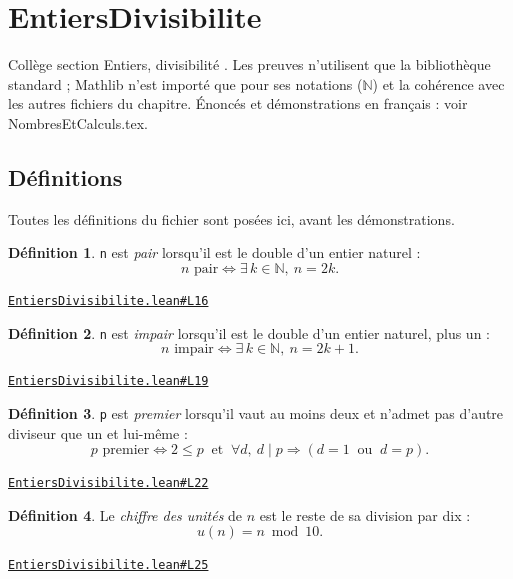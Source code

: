 \documentclass[11pt,a4paper]{article}
\theoremstyle{definition}
\newtheorem{definition}{Définition}
\theoremstyle{plain}
\newcommand{\source}[2]{\par\smallskip\noindent\hfill{\footnotesize\href{#1}{\texttt{#2}}}\par\smallskip}
\begin{document}
\section{EntiersDivisibilite}

\noindent
Collège \textemdash{} section \og{} Entiers, divisibilité \fg{}.
Les preuves n'utilisent que la bibliothèque standard ; Mathlib n'est importé que pour
ses notations (\(\mathbb{N}\)) et la cohérence avec les autres fichiers du chapitre.
Énoncés et démonstrations en français : voir NombresEtCalculs.tex.

\subsection{Définitions}

\noindent
Toutes les définitions du fichier sont posées ici, avant les démonstrations.

\begin{definition}
\texttt{n} est \emph{pair} lorsqu'il est le double d'un entier naturel :
\[ n \text{ pair} \iff \exists\, k \in \mathbb{N},\ n = 2k . \]
\end{definition}
\source{https://github.com/Commutator-IO/learn-lean/blob/main/courses/01-college/01-nombres-et-calculs/EntiersDivisibilite.lean\#L16}{EntiersDivisibilite.lean\#L16}

\begin{definition}
\texttt{n} est \emph{impair} lorsqu'il est le double d'un entier naturel, plus un :
\[ n \text{ impair} \iff \exists\, k \in \mathbb{N},\ n = 2k + 1 . \]
\end{definition}
\source{https://github.com/Commutator-IO/learn-lean/blob/main/courses/01-college/01-nombres-et-calculs/EntiersDivisibilite.lean\#L19}{EntiersDivisibilite.lean\#L19}

\begin{definition}
\texttt{p} est \emph{premier} lorsqu'il vaut au moins deux et n'admet pas d'autre
diviseur que un et lui-même :
\[ p \text{ premier} \iff 2 \le p \ \text{ et } \ \forall d,\ d \mid p \Rightarrow
   (d = 1 \ \text{ ou } \ d = p) . \]
\end{definition}
\source{https://github.com/Commutator-IO/learn-lean/blob/main/courses/01-college/01-nombres-et-calculs/EntiersDivisibilite.lean\#L22}{EntiersDivisibilite.lean\#L22}

\begin{definition}
Le \emph{chiffre des unités} de $n$ est le reste de sa division par dix :
\[ u(n) = n \bmod 10 . \]
\end{definition}
\source{https://github.com/Commutator-IO/learn-lean/blob/main/courses/01-college/01-nombres-et-calculs/EntiersDivisibilite.lean\#L25}{EntiersDivisibilite.lean\#L25}
\end{document}
